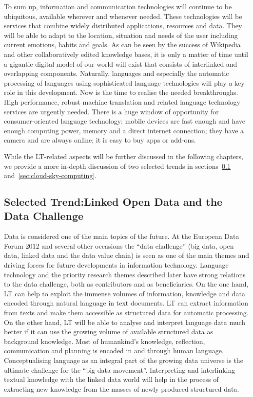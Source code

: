 \documentclass[10pt, plain]{../../metanetpaper}
\begin{document}
\begin{multicols}{2}
To sum up, information and communication technologies will continue to be ubiquitous, available wherever and whenever needed. These technologies will be services that combine widely distributed applications, resources and data. They will be able to adapt to the location, situation and needs of the user including current emotions, habits and goals. As can be seen by the success of Wikipedia and other collaboratively edited knowledge bases, it is only a matter of time until a gigantic digital model of our world will exist that consists of interlinked and overlapping components. Naturally, languages and especially the automatic processing of languages using sophisticated language technologies will play a key role in this development. Now is the time to realise the needed breakthroughs. High performance, robust machine translation and related language technology services are urgently needed. There is a huge window of opportunity for consumer-oriented language technology: mobile devices are fast enough and have enough computing power, memory and a direct internet connection; they have a camera and are always online; it is easy to buy apps or add-ons.

While the LT-related aspects will be further discussed in the following chapters, we provide a more in-depth discussion of two selected trends in sections~\ref{sec:linked-data-open} and~\ref{sec:cloud-sky-computing}.

\subsection[Selected Trend: Linked Open Data and the Data Challenge]{Selected Trend:\newline Linked Open Data and the Data Challenge}
\label{sec:linked-data-open}

Data is considered one of the main topics of the future. At the European Data Forum 2012 and several other occasions the ``data challenge'' (big data, open data, linked data and the data value chain) is seen as one of the main themes and driving forces for future developments in information technology. Language technology and the priority research themes described later have strong relations to the data challenge, both as contributors and as beneficiaries. On the one hand, LT can help to exploit the immense volumes of information, knowledge and data encoded through natural language in text documents. LT can extract information from texts and make them accessible as structured data for automatic processing. On the other hand, LT will be able to analyse and interpret language data much better if it can use the growing volume of available structured data as background knowledge. 
%
Most of humankind's knowledge, reflection, communication and planning is encoded in and through human language. Conceptualising language as an integral part of the growing data universe is the ultimate challenge for the “big data movement”. Interpreting and interlinking textual knowledge with the linked data world will help in the process of extracting new knowledge from the masses of newly produced structured data.


\end{multicols}
\end{document}
